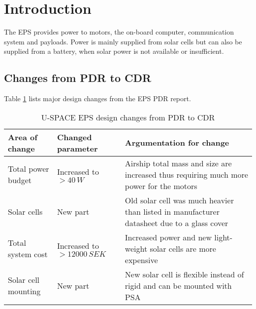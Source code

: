 \newpage
\section{Introduction}
\label{sec:introduction}

The \ac{EPS} provides power to motors, the on-board computer, communication system and payloads. Power is mainly supplied from solar cells but can also be supplied from a battery, when solar power is not available or insufficient. 

\subsection{Changes from PDR to CDR}
\label{sec:changes_pdr_to_cdr}
%
Table \ref{tab:pdr_to_cdr} lists major design changes from the \ac{EPS} \ac{PDR} report.

\begin{table}[H]
\centering
\caption{U-SPACE \ac{EPS} design changes from PDR to CDR}
\label{tab:pdr_to_cdr}
\begin{tabular}{p{}p{}p{}}
\hline
\textbf{Area of change} & \textbf{Changed parameter } & \textbf{Argumentation for change}\\
\hline
Total power budget & Increased to $>40\,W$ & Airship total mass and size are increased thus requiring much more power for the motors\\
Solar cells & New part & Old solar cell was much heavier than listed in manufacturer datasheet due to a glass cover\\
Total system cost & Increased to $>12000\,SEK$ & Increased power and new light-weight solar cells are more expensive\\
Solar cell mounting & New part & New solar cell is flexible instead of rigid and can be mounted with \ac{PSA}\\
\hline
\end{tabular}
\end{table} 